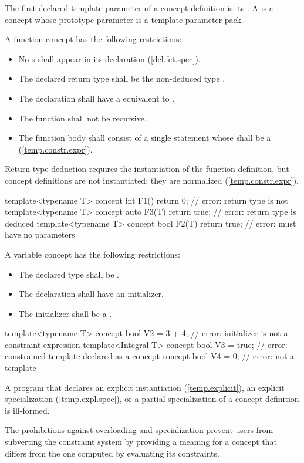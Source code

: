 \pnum
The first declared template parameter of a concept definition is its
. 
% 
A  is a concept whose prototype parameter
is a template parameter pack.


\pnum
A function concept has the following restrictions:
\begin{itemize}
  \item No s shall
       appear in its declaration (\ref{dcl.fct.spec}). 
  \item The declared return type shall be the non-deduced type . 
  \item The declaration shall have a 
  equivalent to \tcode{()}. 
  \item The function shall not be recursive. 
  \item The function body shall consist of a single  
  statement whose  shall be a
  (\ref{temp.constr.expr}).
\end{itemize}
% 
\enternote
Return type deduction requires the instantiation of the function 
definition, but concept definitions are not instantiated; they
are normalized (\ref{temp.constr.expr}).
\exitnote
% 
\enterexample
\begin{codeblock}
template<typename T> 
  concept int F1() { return 0; }      // error: return type is not 
template<typename T> 
  concept auto F3(T) { return true; } // error: return type is deduced
template<typename T> 
  concept bool F2(T) { return true; } // error: must have no parameters
\end{codeblock}
\exitexample

\pnum
A variable concept has the following restrictions:
\begin{itemize}
  \item The declared type shall be . 
  \item The declaration shall have an initializer. 
  \item The initializer shall be a 
  . 
\end{itemize}
\enterexample
\begin{codeblock}
template<typename T> 
  concept bool V2 = 3 + 4; // error: initializer is not a constraint-expression
template<Integral T> 
  concept bool V3 = true;  // error: constrained template declared as a concept
concept bool V4 = 0;       // error: not a template
\end{codeblock}
\exitexample

\pnum
A program that declares an explicit instantiation
(\ref{temp.explicit}), an explicit specialization 
(\ref{temp.expl.spec}), or a partial specialization 
of a concept definition is ill-formed.

\enternote
The prohibitions against overloading and specialization prevent
users from subverting the constraint system by providing a meaning 
for a concept that differs from the one computed by evaluating its 
constraints.
\exitnote

